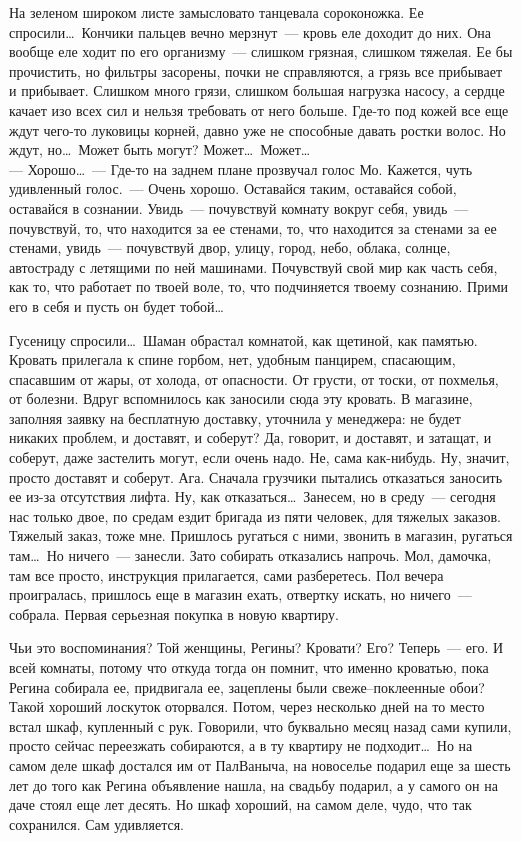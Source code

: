 На зеленом широком листе замысловато танцевала сороконожка. Ее спросили\ldots\ 
Кончики пальцев вечно мерзнут~--- кровь еле доходит до них. Она вообще еле 
ходит по его организму~--- слишком грязная, слишком тяжелая. Ее бы прочистить, но 
фильтры засорены, почки не справляются, а грязь все прибывает и прибывает. 
Слишком много грязи, слишком большая нагрузка насосу, а сердце качает изо всех 
сил и нельзя требовать от него больше. Где-то под кожей все еще ждут чего-то 
луковицы корней, давно уже не способные давать ростки волос. Но ждут, но\ldots\ 
Может быть могут? Может\ldots\ Может\ldots\\
--- Хорошо\ldots~--- Где-то на заднем плане прозвучал голос Мо. Кажется, чуть 
удивленный голос.~--- Очень хорошо. Оставайся таким, оставайся собой, оставайся 
в сознании. Увидь~--- почувствуй комнату вокруг себя, увидь~--- почувствуй, то, 
что находится за ее стенами, то, что находится за стенами за ее стенами, увидь~--- 
почувствуй двор, улицу, город, небо, облака, солнце, автостраду с летящими по 
ней машинами. Почувствуй свой мир как часть себя, как то, что работает по твоей 
воле, то, что подчиняется твоему сознанию. Прими его в себя и пусть он будет 
тобой\ldots

Гусеницу спросили\ldots\ Шаман обрастал комнатой, как щетиной, как памятью. 
Кровать прилегала к спине горбом, нет, удобным панцирем, спасающим, спасавшим от жары, 
от холода, от опасности. От грусти, от тоски, от похмелья, от болезни. Вдруг 
вспомнилось как заносили сюда эту кровать. В магазине, заполняя заявку на 
бесплатную доставку, уточнила у менеджера: не будет никаких проблем, и 
доставят, и соберут? Да, говорит, и доставят, и затащат, и соберут, даже застелить могут, 
если очень надо. Не, сама как-нибудь. Ну, значит, просто доставят и соберут. 
Ага. Сначала грузчики пытались отказаться заносить ее из-за отсутствия лифта. 
Ну, как отказаться\ldots\ Занесем, но в среду~--- сегодня нас только двое, по 
средам ездит бригада из пяти человек, для тяжелых заказов. Тяжелый заказ, тоже мне. 
Пришлось ругаться с ними, звонить в магазин, ругаться там\ldots\ Но ничего~--- 
занесли. Зато собирать отказались напрочь. Мол, дамочка, там все просто, 
инструкция прилагается, сами разберетесь. Пол вечера проигралась, пришлось еще в 
магазин ехать, отвертку искать, но ничего~--- собрала. Первая серьезная покупка 
в новую квартиру.

Чьи это воспоминания? Той женщины, Регины? Кровати? Его? Теперь~--- его. И всей 
комнаты, потому что откуда тогда он помнит, что именно кроватью, пока Регина 
собирала ее, придвигала ее, зацеплены были свеже--поклеенные обои? Такой хороший 
лоскуток оторвался. Потом, через несколько дней на то место встал шкаф, 
купленный с рук. Говорили, что буквально месяц назад сами купили, просто сейчас 
переезжать собираются, а в ту квартиру не подходит\ldots\ Но на самом деле шкаф 
достался им от ПалВаныча, на новоселье подарил еще за шесть лет до того как 
Регина объявление нашла, на свадьбу подарил, а у самого он на даче стоял еще 
лет десять. Но шкаф хороший, на самом деле, чудо, что так сохранился. Сам 
удивляется.

